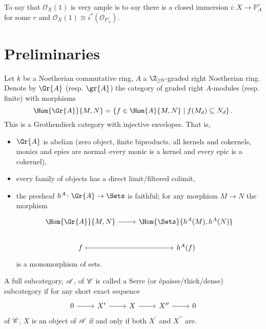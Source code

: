 \documentclass[10pt]{amsart}
\begin{document}
\begin{rmk}
  To say that $\mathcal{O}_X(1)$ is very ample is to say there is a closed immersion $i \colon X \rightarrow \mathbb{P}^r_A$ for some $r$ and $\mathcal{O}_X(1) \cong i^*(\mathcal{O}_{\mathbb{P}^r_A})$.
\end{rmk}
\section{Preliminaries}
Let $k$ be a Noetherian commutative ring, $A$ a $\Z_{\geq 0}$-graded right Noetherian ring.
Denote by $\Gr{A}$ (resp. $\gr{A}$) the category of graded right $A$-modules (resp. finite) with morphisms
$$\Hom{\Gr{A}}{M,N} = \left\{f \in \Hom{A}{M,N} \;\middle\vert\; f(M_d) \subseteq N_d\right\}.$$
This is a Grothendieck category with injective envelopes.
That is,
\begin{itemize}
\item
  $\Gr{A}$ is abelian (zero object, finite biproducts, all kernels and cokernels, monics and epics are normal--every monic is a kernel and every epic is a cokernel),
\item
  every family of objects has a direct limit/filtered colimit,
\item
  the presheaf $h^A \colon \Gr{A} \rightarrow \Sets$ is faithful; for any morphism $M \rightarrow N$ the morphism
  $$\begin{tikzcd}
    \Hom{\Gr{A}}{M, N} \arrow{r}& \Hom{\Sets}{h^A(M), h^A(N)}\\
    f \arrow[mapsto]{r} & h^A(f)
  \end{tikzcd}$$
  is a monomorphism of sets.
\end{itemize}

\begin{defn}
  A full subcategory, $\mathscr{A}$, of $\mathscr{C}$ is called a Serre (or \'{e}paisse/thick/dense) subcategory if for any short exact sequence
  $$\begin{tikzcd}
    0 \arrow{r} & X^\prime \arrow{r} & X \arrow{r} & X^{\prime\prime} \arrow{r} & 0
  \end{tikzcd}$$
  of $\mathscr{C}$, $X$ is an object of $\mathscr{A}$ if and only if both $X^\prime$ and $X^{\prime\prime}$ are.
\end{defn}
\end{document}

